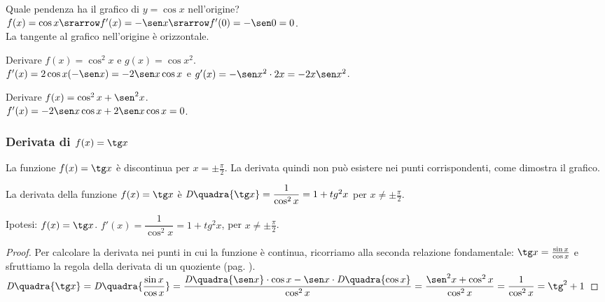 \begin{esempio}
Quale pendenza ha il grafico di $y=\cos x$ nell'origine?\\
$f(x)= \cos x \srarrow f'(x)=-\sen x\srarrow f'(0)=-\sen 0=0$.\\
La tangente al grafico nell'origine è orizzontale.
\end{esempio} 

\begin{esempio}
Derivare $f(x)=\cos^2 x$ e $g(x)= \cos x^2$.\\
$f'(x)=2\cos x(-\sen x)=-2\sen x\cos x$ e $g'(x)=-\sen x^2\cdot 2x=-2x\sen 
x^2$.
\end{esempio}

\begin{esempio}
Derivare $f(x)=\cos^2 x +\sen^2 x$.\\
$f'(x)=-2\sen x\cos x + 2\sen x \cos x = 0$.
\end{esempio}


\subsubsection{Derivata di $f(x)=\tg x$}
La funzione $f(x)=\tg x$ è discontinua per $x= \pm\frac{\pi}{2}$. La 
derivata
quindi non può esistere nei punti corrispondenti, come dimostra il grafico.

\begin{inaccessibleblock}
  \begin{minipage}[]{.47\textwidth}
    \begin{center} \tangente \end{center}
 \end{minipage} 
  \hfill
 \begin{minipage}[]{.47\textwidth}
 \begin{center} \tangentitangente \end{center}
 \end{minipage}
\end{inaccessibleblock}
\label{}

\begin{teorema}
   La derivata della funzione $f(x)=\tg x$ è $\mathit{D}\quadra{\tg x}=
   \dfrac{1}{\cos^2 x}=1+tg^2 x$ per $x\ne \pm\frac{\pi}{2}$.
\end{teorema}
\noindent Ipotesi: $f(x)=\tg x$. \tab $f'(x)=\dfrac{1}{\cos^2 x}=1+tg^2 x$,
per $x\ne\pm\frac{\pi}{2}$.
\begin{proof}
Per calcolare la derivata nei punti in cui la funzione è continua, 
ricorriamo
alla seconda relazione fondamentale: $\tg x=\frac{\sin x}{\cos x}$ e
sfruttiamo la regola della derivata di un quoziente (pag. 
\pageref{sec:diff01_regolederivate}).\\
$\mathit{D}\quadra{\tg x}=\mathit{D}\quadra{\dfrac{\sin x}{\cos x}}=
\dfrac{\mathit{D}\quadra{\sen x}\cdot \cos x-\sen x\cdot 
  \mathit{D}\quadra{\cos x}} {\cos^2 x}=
\dfrac{\sen^2 x +\cos^2 x}{\cos^2 x}=\dfrac{1}{\cos^2 x}=\tg^2+1$
\end{proof}

